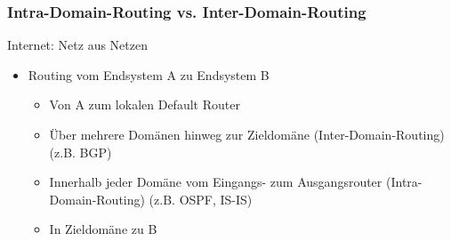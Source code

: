     \subsubsection{Intra-Domain-Routing vs. Inter-Domain-Routing}
      Internet: Netz aus Netzen
      \begin{itemize}
        \item Routing vom Endsystem A zu Endsystem B
          \begin{itemize}
            \item Von A zum lokalen Default Router
            \item Über mehrere Domänen hinweg zur Zieldomäne (Inter-Domain-Routing) (z.B. BGP)
            \item Innerhalb jeder Domäne vom Eingangs- zum Ausgangsrouter (Intra-Domain-Routing)
              (z.B. OSPF, IS-IS)
            \item In Zieldomäne zu B
          \end{itemize}
      \end{itemize}
